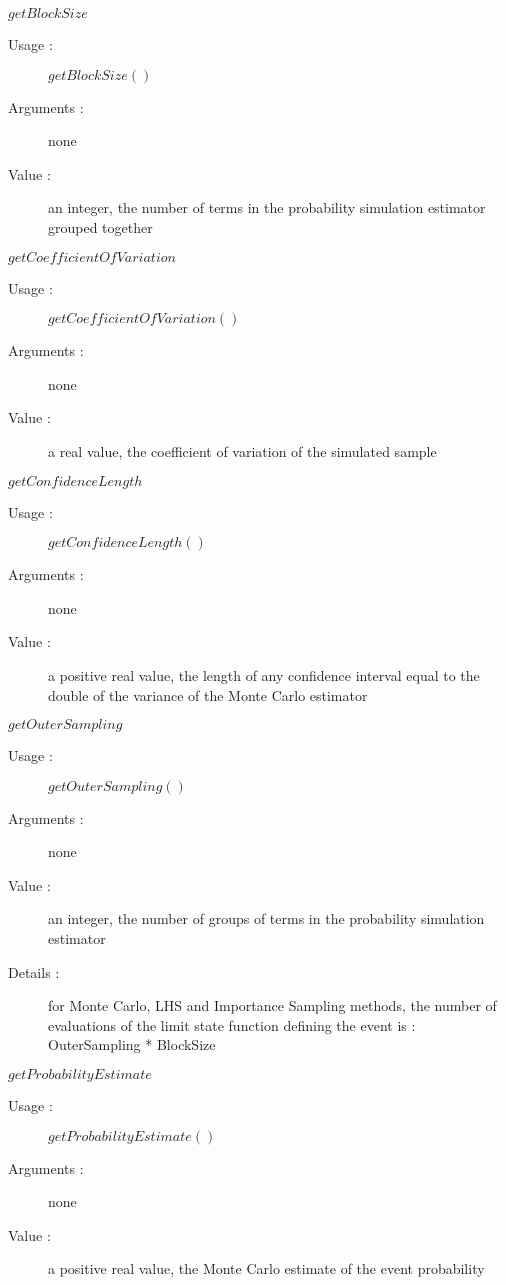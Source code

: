 \begin{description}
\begin{description}
  \item $getBlockSize$
    \begin{description}
    \item[Usage :] $getBlockSize()$
    \item[Arguments :] none
    \item[Value :]  an integer, the number of terms in the probability simulation estimator grouped together
    \end{description}
    \bigskip

  \item $getCoefficientOfVariation$
    \begin{description}
    \item[Usage :] $getCoefficientOfVariation()$
    \item[Arguments :] none
    \item[Value :]  a real value,  the coefficient of variation of the simulated sample
    \end{description}
    \bigskip

  \item $getConfidenceLength$
    \begin{description}
    \item[Usage :] $getConfidenceLength()$
    \item[Arguments :] none
    \item[Value :]  a positive real value, the length of any confidence interval equal to the double of the variance of the Monte Carlo estimator
    \end{description}
    \bigskip

  \item $getOuterSampling$
    \begin{description}
    \item[Usage :] $getOuterSampling()$
    \item[Arguments :] none
    \item[Value :]  an integer,  the number of groups of terms in the probability simulation estimator
    \item[Details :]  for Monte Carlo,  LHS and Importance Sampling methods, the  number of evaluations of the limit state function defining the event is : OuterSampling * BlockSize
    \end{description}
    \bigskip

  \item $getProbabilityEstimate$
    \begin{description}
    \item[Usage :] $getProbabilityEstimate()$
    \item[Arguments :] none
    \item[Value :]  a positive real value, the Monte Carlo estimate of the event probability
    \end{description}
    \bigskip


\end{description}
\end{description}
